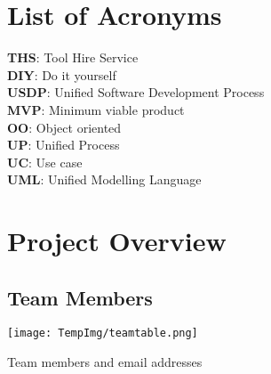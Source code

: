 \documentclass[fontsize=11pt]{extarticle}
\numberwithin{figure}{section} %
\numberwithin{table}{section}%
\begin{document}

\tableofcontents
%
%
\newpage

\listoftables
{}
\listoffigures

\newpage

\section*{List of Acronyms}\label{acronyms}
\textbf{THS}: Tool Hire Service \\
\textbf{DIY}: Do it yourself \\
\textbf{USDP}: Unified Software Development Process  \\
\textbf{MVP}: Minimum viable product \\
\textbf{OO}: Object oriented \\
\textbf{UP}: Unified Process \\
\textbf{UC}: Use case \\
\textbf{UML}: Unified Modelling Language\\



\newpage

\clearpage
{}
\hypertarget{project-overview}{%
\section{Project Overview}\label{project-overview}}

\hypertarget{team-members}{%
\subsection{Team Members}\label{team-members}}

\begin{table}[H]
      \centering
      \texttt{[image: TempImg/teamtable.png]}
      \caption{Team members and email addresses}
\label{conreq}
 \end{table}
\end{document}
